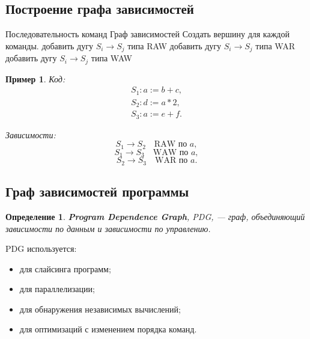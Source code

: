 \documentclass[12pt,a4paper]{article}
\newtheorem{definition}{Определение}
\newtheorem{example}{Пример}
\begin{document}
\subsection{Построение графа зависимостей}

\begin{algorithm}[H]
\caption{Построение простого графа зависимостей для последовательности команд}
\begin{algorithmic}[1]
\Require Последовательность команд
\Ensure Граф зависимостей
\State Создать вершину для каждой команды.
        \State добавить дугу $S_i\to S_j$ типа RAW
    \EndIf
        \State добавить дугу $S_i\to S_j$ типа WAR
    \EndIf
        \State добавить дугу $S_i\to S_j$ типа WAW
    \EndIf
\EndFor
\end{algorithmic}
\end{algorithm}

\begin{example}
Код:
\[
\begin{array}{l}
S_1: a := b+c,\\
S_2: d := a*2,\\
S_3: a := e+f.
\end{array}
\]

Зависимости:
\[
S_1 \to S_2 \quad \text{RAW по } a,
\]
\[
S_1 \to S_3 \quad \text{WAW по } a,
\]
\[
S_2 \to S_3 \quad \text{WAR по } a.
\]
\end{example}

\subsection{Граф зависимостей программы}

\begin{definition}
\textbf{Program Dependence Graph}, PDG, --- граф, объединяющий зависимости по данным и зависимости по управлению.
\end{definition}

PDG используется:
\begin{itemize}
    \item для слайсинга программ;
    \item для параллелизации;
    \item для обнаружения независимых вычислений;
    \item для оптимизаций с изменением порядка команд.
\end{itemize}
\end{document}
